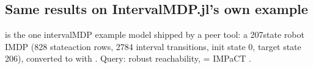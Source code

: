 \documentclass[a4paper,10pt,english]{sphinxmanual}
\begin{document}
\subsection{Same results on IntervalMDP.jl’s own example}
\label{\detokenize{comparison/impact-vs-intervalmdp:same-results-on-intervalmdp-jl-s-own-example}}
\sphinxAtStartPar
{} is the one interval\sphinxhyphen{}MDP example model shipped by a peer tool: a
207\sphinxhyphen{}state robot IMDP (828 state\sphinxhyphen{}action rows, 2784 interval transitions, init state 0,
target state 206), converted to  with . Query: robust
reachability,  = IMPaCT .
\end{document}
